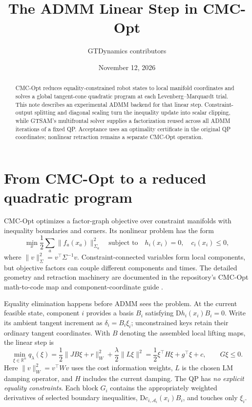 \documentclass[11pt,letterpaper]{article}
\title{\vspace{-1.7em}The ADMM Linear Step in CMC-Opt}
\author{GTDynamics contributors}
\date{November 12, 2026}
\newcommand{\R}{\mathbb{R}}
\begin{document}
\maketitle
\thispagestyle{fancy}
\vspace{-1.6em}
\begin{abstract}
CMC-Opt reduces equality-constrained robot states to local manifold coordinates
and solves a global tangent-cone quadratic program at each Levenberg--Marquardt
trial. This note describes an experimental ADMM backend for that linear step.
Constraint-output splitting and diagonal scaling turn the inequality update
into scalar clipping, while GTSAM's multifrontal solver supplies a factorization
reused across all ADMM iterations of a fixed QP. Acceptance uses an optimality
certificate in the original QP coordinates; nonlinear retraction remains a
separate CMC-Opt operation.
\end{abstract}

\section{From CMC-Opt to a reduced quadratic program}
CMC-Opt optimizes a factor-graph objective over constraint manifolds with
inequality boundaries and corners. Its nonlinear problem has the form
\begin{equation}
  \min_x \frac12\sum_a\|f_a(x_a)\|_{\Sigma_a}^{2}
  \quad\text{subject to}\quad h_i(x_i)=0,\quad c_i(x_i)\leq0,
  \label{eq:nlp}
\end{equation}
where $\|v\|_\Sigma^2=v^\top\Sigma^{-1}v$. Constraint-connected variables form
local components, but objective factors can couple different components and
times. The detailed geometry and retraction machinery are documented in the
repository's CMC-Opt math-to-code map and component-coordinate guide
\cite{cmc,coordinates}.

Equality elimination happens before ADMM sees the problem. At the current
feasible state, component $i$ provides a basis $B_i$ satisfying
$\mathrm{D}h_i(x_i)B_i=0$. Write its ambient tangent increment as
$\delta_i=B_i\xi_i$; unconstrained keys retain their ordinary tangent
coordinates. With $B$ denoting the assembled local lifting maps, the linear
step is
\begin{equation}
  \min_{\xi\in\R^n} q_\lambda(\xi)
  =\frac12\|JB\xi+r\|_W^2+\frac\lambda2\|L\xi\|^2
  =\frac12\xi^\top H\xi+g^\top\xi+c,
  \qquad G\xi\leq0.
  \label{eq:qp}
\end{equation}
Here $\|v\|_W^2=v^\top Wv$ uses the cost information weights, $L$ is the
chosen LM damping operator, and $H$ includes the current damping. The QP has
\emph{no explicit equality constraints}. Each block $G_i$ contains the
appropriately weighted derivatives of selected boundary inequalities,
$\mathrm{D}c_{i,\mathcal A_i}(x_i)B_i$, and touches only $\xi_i$.
\end{document}

